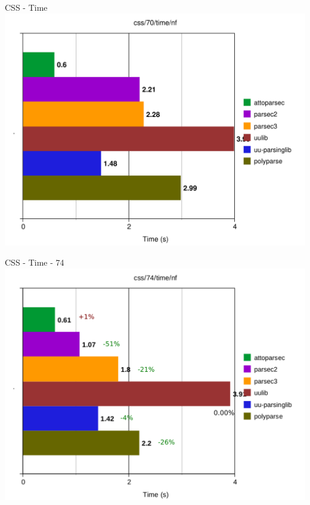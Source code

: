 \documentclass{beamer}
\begin{document}
\begin{frame}{CSS - Time}
\includegraphics[scale=0.5]{presentation/css-70-time-nf.pdf}
\end{frame}

\begin{frame}{CSS - Time - 74}
\includegraphics[scale=0.5]{presentation/css-74-time-nf_.pdf}
\end{frame}
\end{document}

